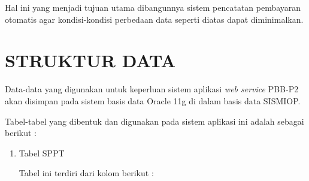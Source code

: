 \documentclass[pdftex,12pt, oneside]{article}
\begin{document}
Hal ini yang menjadi tujuan utama dibangunnya sistem pencatatan pembayaran otomatis agar kondisi-kondisi perbedaan data seperti diatas dapat diminimalkan.

\section{STRUKTUR DATA}

Data-data yang digunakan untuk keperluan sistem aplikasi \textit{web service} PBB-P2 akan disimpan pada sistem basis data Oracle 11g di dalam basis data SISMIOP.

Tabel-tabel yang dibentuk dan digunakan pada sistem aplikasi ini adalah sebagai berikut :

\begin{enumerate}[1.]
  \item Tabel SPPT
  
  Tabel ini terdiri dari kolom berikut :
    

\end{enumerate}
\end{document}
